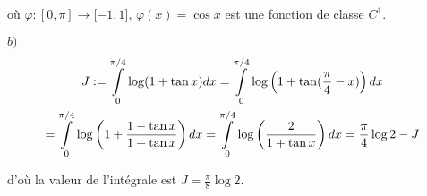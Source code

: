 {\begin{enumerate}
{o\`{u} $\varphi :[0,\pi ]\rightarrow \lbrack -1,1]$, $\varphi
(x)=\cos x$ est une fonction de classe $C^{1}$.

$b)$
\begin{multline*}
J :=\overset{\pi /4}{\underset{0}{\int }}\log (1+\tan x)dx=\overset{\pi /4}{%
\underset{0}{\int }}\log \left(1+\tan (\frac{\pi }{4}-x)\right)dx\\
=\overset{\pi /4}{%
\underset{0}{\int }}\log \left(1+\frac{1-\tan x}{1+\tan x}\right)dx
=\overset{\pi /4}{\underset%
{0}{\int }}\log \left(\frac{2}{1+\tan x}\right)dx =\frac{\pi }{4}\log
2-J
\end{multline*}

d'o\`{u} la valeur de l'int\'{e}grale est $J=\frac{\pi }{8}\log
2.$}
\end{enumerate}
}